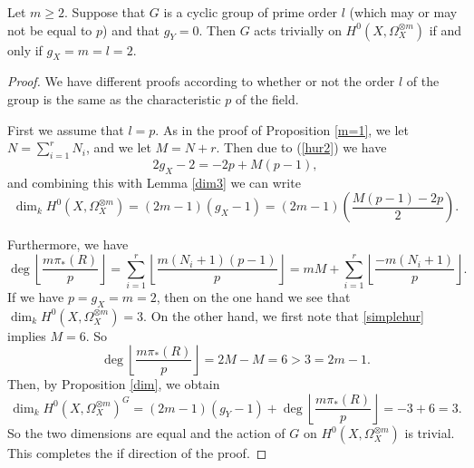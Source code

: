     \begin{prop}\label{triv}
    Let $m \geq 2$. 
    Suppose that $G$ is a cyclic group of prime order $l$ (which may or may not be equal to $p$) and that $g_Y=0$. 
    Then $G$ acts trivially on $H^0(X,\Omega_X^{\otimes m})$ if and only if $g_X=m=l=2$.
    \end{prop}
    \begin{proof}
    We have different proofs according to whether or not the order $l$ of the group is the same as the characteristic $p$ of the field.
    
    
    First we assume that $l=p$. 
    As in the proof of Proposition \ref{m=1}, we let $N=\sum_{i=1}^r N_i$, and we let $M=N+r$.
    Then due to (\ref{hur2}) we have
        \begin{equation}\label{simplehur}
        2g_X-2=-2p+M(p-1),
        \end{equation}
    and combining this with Lemma \ref{dim3} we can write
        \begin{equation}\label{altdim2}
        \dim_kH^0(X,\Omega_X^{\otimes m})=(2m-1)(g_X-1)=(2m-1)\left(\frac{M(p-1)-2p}{2}\right).
        \end{equation}
    
    Furthermore, we have
        \begin{equation}\label{altdim}
        \deg\left\lfloor \frac{m\pi_*(R)}{p} \right\rfloor = \sum_{i=1}^r\left\lfloor \frac{m(N_i+1)(p-1)}{p} \right\rfloor  = mM + \sum_{i=1}^r\left\lfloor \frac{-m(N_i+1)}{p} \right\rfloor.
        \end{equation}
    If we have $p=g_X=m=2$, then on the one hand we see that $\dim_kH^0(X,\Omega_X^{\otimes m}) =3$. 
    On the other hand, we first note that \eqref{simplehur} implies $M=6$.
    So 
        \begin{equation*}
        \deg\left\lfloor \frac{m\pi_*(R)}{p}\right\rfloor = 2M -M =6 > 3 = 2m-1.
        \end{equation*}  
    Then, by Proposition \ref{dim}, we obtain 
        \begin{equation*}
        \dim_kH^0(X,\Omega_X^{\otimes m})^G = (2m-1)(g_Y-1)+\deg\left\lfloor \frac{m\pi_*(R)}{p} \right\rfloor = -3 + 6 = 3.
        \end{equation*}
    So the two dimensions are equal and the action of $G$ on $H^0(X,\Omega_X^{\otimes m})$ is trivial. 
    This completes the if direction of the proof.
    

\end{proof}
